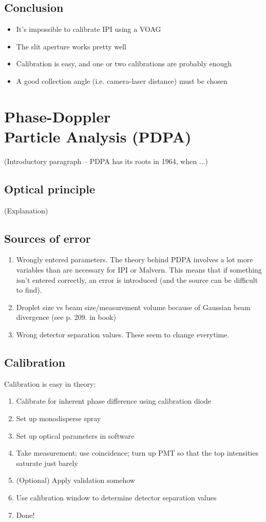 \documentclass[10pt]{book}
\begin{document}
\section{Conclusion}
\begin{itemize}
    \item It's impossible to calibrate IPI using a VOAG
    \item The slit aperture works pretty well
    \item Calibration is easy, and one or two calibrations are probably enough
    \item A good collection angle (i.e. camera-laser distance) must be chosen
\end{itemize}

\chapter{Phase-Doppler\\Particle Analysis (PDPA)}
(Introductory paragraph -- PDPA has its roots in 1964, when ...)

\section{Optical principle}
(Explanation)

\section{Sources of error}
\begin{enumerate}
    \item Wrongly entered parameters. The theory behind PDPA involves a lot more
        variables than are necessary for IPI or Malvern. This means that if
        something isn't entered correctly, an error is introduced (and the
        source can be difficult to find).
    \item Droplet size vs beam size/measurement volume because of Gaussian beam
        divergence (see p. 209. in book)
    \item Wrong detector separation values. These seem to change everytime.
\end{enumerate}

\section{Calibration}
Calibration is easy in theory:
\begin{enumerate}
    \item Calibrate for inherent phase difference using calibration diode
    \item Set up monodisperse spray
    \item Set up optical parameters in software
    \item Take measurement; use coincidence; turn up PMT so that the top
        intensities saturate just barely
    \item (Optional) Apply validation somehow
    \item Use calibration window to determine detector separation values
    \item Done!
\end{enumerate}
\end{document}
